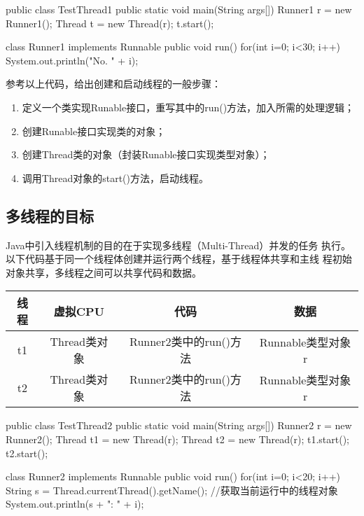 
\begin{javaCode}
public class TestThread1 {
  public static void main(String args[]) {
    Runner1 r = new Runner1();
    Thread t = new Thread(r);
    t.start();
  }
}

class Runner1 implements Runnable {
  public void run() {
    for(int i=0; i<30; i++) {
      System.out.println("No. " + i);
    }
  }
}
\end{javaCode}

参考以上代码，给出创建和启动线程的一般步骤：

\begin{enumerate}
\item 定义一个类实现Runable接口，重写其中的run()方法，加入所需的处理逻辑；
\item 创建Runable接口实现类的对象；
\item 创建Thread类的对象（封装Runable接口实现类型对象）；
\item 调用Thread对象的start()方法，启动线程。
\end{enumerate}

\subsection{多线程的目标}

Java中引入线程机制的目的在于实现{\hei 多线程（Multi-Thread）}并发的任务
执行。以下代码基于同一个线程体创建并运行两个线程，基于线程体共享和主线
程初始对象共享，多线程之间可以共享代码和数据。

\begin{table}[!htbp]
\centering
\begin{tabular}{|c|c|c|c|}
  \hline
  {\bf 线程} & {\bf 虚拟CPU} & {\bf 代码} & {\bf 数据} \\
  \hline
  t1 & Thread类对象 & Runner2类中的run()方法 & Runnable类型对象r \\
  \hline
  t2 & Thread类对象 & Runner2类中的run()方法 & Runnable类型对象r \\
  \hline
\end{tabular}
\end{table}


\begin{javaCode}
public class TestThread2 {
  public static void main(String args[]) {
    Runner2 r = new Runner2();
    Thread t1 = new Thread(r);
    Thread t2 = new Thread(r);
    t1.start();
    t2.start();
  }
}

class Runner2 implements Runnable {
  public void run() {
    for(int i=0; i<20; i++) {
      String s = Thread.currentThread().getName(); //获取当前运行中的线程对象
      System.out.println(s + ": " + i);
    }
  }
}
\end{javaCode}

